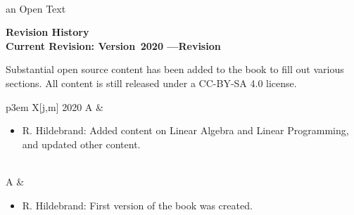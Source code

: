 \setcounter{page}{1}
\thispagestyle{empty}


\vspace{-3em}

\vspace{-2em}

\begin{center}
 {\fontsize{24pt}{22pt}\selectfont \textcolor{titletextcolour}{\booksubtitle\;\booktitle}} \\ 
{\fontsize{16pt}{20pt}\selectfont \textcolor{titlemainbgcolour}{an Open Text}} %

\medskip

\end{center}

\setlength{\parskip}{0pt}

\begin{center}
\fontsize{12pt}{14pt}\selectfont\textcolor{titletextcolour}{\textbf{Revision History \\ \smallskip  Current Revision: Version\, 2020%
\enskip---\enskip Revision\,\revision }}
\end{center}

{\footnotesize

\begin{center}
Substantial open source content has been added to the book to fill out various sections.   All content is still released under a CC-BY-SA 4.0 license.
\end{center}

\begin{tabu}{p{3em} X[j,m]} %
\hline
\textcolor{titletextcolour}{2020} \textcolor{titletextcolour}{A} & \begin{itemize} \item R. Hildebrand: Added content on Linear Algebra and Linear Programming, and updated other content.    \end{itemize} \\   A &  \begin{itemize} \item R. Hildebrand: First version of the book was created. \end{itemize} \\ \end{tabu}
\medskip
}


\setlength{\parskip}{\baselineskip}


